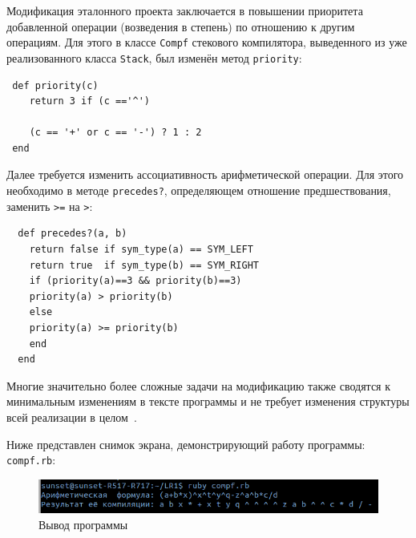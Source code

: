 Модификация эталонного проекта заключается в повышении приоритета добавленной операции (возведения в степень) по отношению к другим операциям. Для этого в классе \verb|Compf| стекового компилятора, выведенного из уже реализованного класса \verb|Stack|, был изменён метод \verb|priority|:
\begin{lstlisting}
 def priority(c)
    return 3 if (c =='^') 

    (c == '+' or c == '-') ? 1 : 2
 end
\end{lstlisting}
Далее требуется изменить ассоциативность арифметической операции. Для этого необходимо в методе \verb|precedes?|, определяющем отношение предшествования, заменить \verb|>=| на \verb|>|:

\begin{lstlisting}
  def precedes?(a, b)
    return false if sym_type(a) == SYM_LEFT 
    return true  if sym_type(b) == SYM_RIGHT
    if (priority(a)==3 && priority(b)==3)
    priority(a) > priority(b) 
    else
    priority(a) >= priority(b)
    end
  end
\end{lstlisting}

 Многие значительно более сложные задачи на модификацию также сводятся к минимальным изменениям в тексте программы и не требует изменения структуры всей реализации в целом~\cite{stack}.

Ниже представлен снимок экрана, демонстрирующий работу программы: \\ \verb|compf.rb|:
\begin{figure}[ht!]
\begin{center}
\includegraphics[width=1\hsize]{images/screen}
\end{center}
\caption{Вывод программы}\label{fig:screen}
\end{figure}


